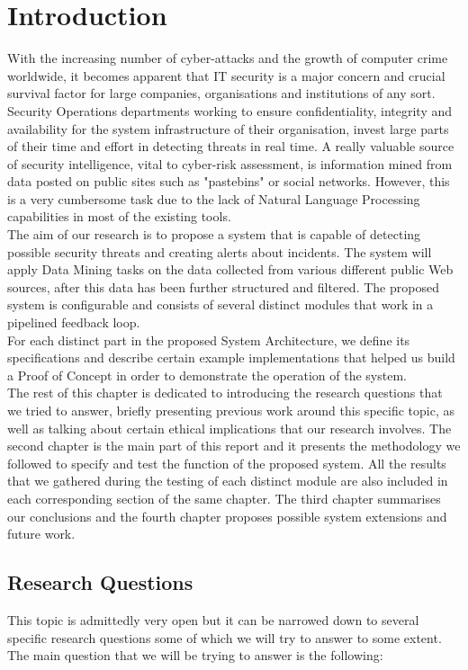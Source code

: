 \documentclass[12pt]{article}
\begin{document}
\newpage

\tableofcontents
\newpage

\section{Introduction}
\parbox{\linewidth}{
With the increasing number of cyber-attacks and the growth of computer crime worldwide, it becomes apparent that IT security is a major concern and crucial survival factor for large companies, organisations and institutions of any sort. Security Operations departments working to ensure confidentiality, integrity and availability for the system infrastructure of their organisation, invest large parts \cite{cyber} of their time and effort in detecting threats in real time. A really valuable source of security intelligence, vital to cyber-risk assessment, is information mined from data posted on public sites such as "pastebins" or social networks. However, this is a very cumbersome task due to the lack of Natural Language Processing capabilities in most of the existing tools.
\hfill \break \\
The aim of our research is to propose a system that is capable of detecting possible security threats and creating alerts about incidents. The system will apply Data Mining tasks on the data collected from various different public Web sources, after this data has been further structured and filtered. The proposed system is configurable and consists of several distinct modules that work in a pipelined feedback loop. 
\hfill \break \\
For each distinct part in the proposed System Architecture, we define its specifications and describe certain example implementations that helped us build a Proof of Concept in order to demonstrate the operation of the system.
\hfill \break \\
The rest of this chapter is dedicated to introducing the research questions that we tried to answer, briefly presenting previous work around this specific topic, as well as talking about certain ethical implications that our research involves. The second chapter is the main part of this report and it presents the methodology we followed to specify and test the function of the proposed system. All the results that we gathered during the testing of each distinct module are also included in each corresponding section of the same chapter. The third chapter summarises our conclusions and the fourth chapter proposes possible system extensions and future work. 
}
\newpage
\subsection{Research Questions}
This topic is admittedly very open but it can be narrowed down to several specific research questions some of which we will try to answer to some extent. The main question that we will be trying to answer is the following:\\[0.1cm]
\end{document}
